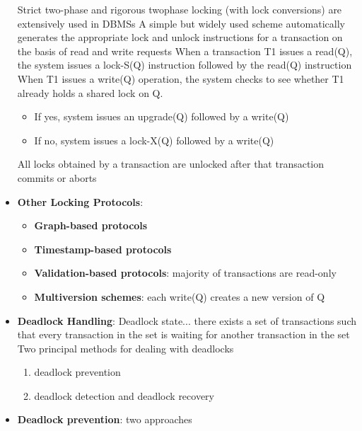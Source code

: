 \documentclass{report}
\begin{document}
\begin{itemize}
            \bigbreak \noindent 
            Strict two-phase and rigorous twophase locking (with lock conversions) are extensively used in DBMSs
            \bigbreak \noindent 
            A simple but widely used scheme automatically generates the appropriate lock and unlock instructions for a transaction on the basis of read and write requests
            \bigbreak \noindent 
            When a transaction T1 issues a read(Q), the system issues a lock-S(Q) instruction followed by the read(Q) instruction
            \bigbreak \noindent 
            When T1 issues a write(Q) operation, the system checks to see whether T1 already holds a shared lock on Q.
            \begin{itemize}
                \item If yes, system issues an upgrade(Q) followed by a write(Q)
                \item If no, system issues a lock-X(Q) followed by a write(Q)
            \end{itemize}
            \bigbreak \noindent 
            All locks obtained by a transaction are unlocked after that transaction commits or aborts
        \item \textbf{Other Locking Protocols}:
            \begin{itemize}
                \item \textbf{Graph-based protocols}
                \item \textbf{Timestamp-based protocols}
                \item \textbf{Validation-based protocols}: majority of transactions are read-only
                \item \textbf{Multiversion schemes}: each write(Q) creates a new version of Q
            \end{itemize}
        \item \textbf{Deadlock Handling}: Deadlock state... there exists a set of transactions such that every transaction in the set is waiting for another transaction in the set
            \bigbreak \noindent 
            Two principal methods for dealing with deadlocks
            \begin{enumerate}
                \item deadlock prevention
                \item deadlock detection and deadlock recovery
            \end{enumerate}
        \item \textbf{Deadlock prevention}: two approaches
            \begin{enumerate}

\end{enumerate}
\end{itemize}
\end{document}

